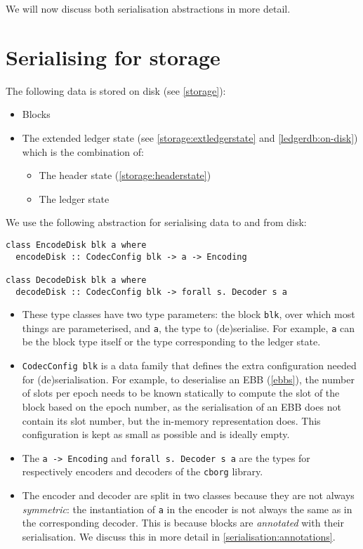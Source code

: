 We will now discuss both serialisation abstractions in more detail.

\section{Serialising for storage}
\label{serialisation:storage}

The following data is stored on disk (see \cref{storage}):

\begin{itemize}
\item Blocks
\item The extended ledger state (see \cref{storage:extledgerstate} and
  \cref{ledgerdb:on-disk}) which is the combination of:
  \begin{itemize}
  \item The header state (\cref{storage:headerstate})
  \item The ledger state
  \end{itemize}
\end{itemize}

We use the following abstraction for serialising data to and from disk:

\begin{lstlisting}
class EncodeDisk blk a where
  encodeDisk :: CodecConfig blk -> a -> Encoding

class DecodeDisk blk a where
  decodeDisk :: CodecConfig blk -> forall s. Decoder s a
\end{lstlisting}

\begin{itemize}
\item These type classes have two type parameters: the block \lstinline!blk!,
  over which most things are parameterised, and \lstinline!a!, the type to
  (de)serialise. For example, \lstinline!a! can be the block type itself or the
  type corresponding to the ledger state.
\item \lstinline!CodecConfig blk! is a data family that defines the extra
  configuration needed for (de)serialisation. For example, to deserialise an EBB
  (\cref{ebbs}), the number of slots per epoch needs to be known statically to
  compute the slot of the block based on the epoch number, as the serialisation
  of an EBB does not contain its slot number, but the in-memory representation
  does. This configuration is kept as small as possible and is ideally empty.
\item The \lstinline!a -> Encoding! and \lstinline!forall s. Decoder s a! are
  the types for respectively encoders and decoders of the \lstinline!cborg!
  library.
\item The encoder and decoder are split in two classes because they are not
  always \emph{symmetric}: the instantiation of \lstinline!a! in the encoder is
  not always the same as in the corresponding decoder. This is because blocks
  are \emph{annotated} with their serialisation. We discuss this in more detail
  in \cref{serialisation:annotations}.
\end{itemize}

